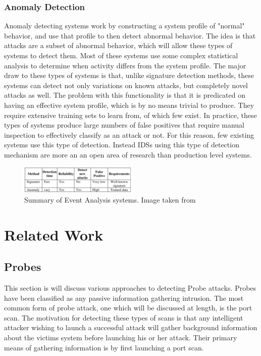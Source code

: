 \documentclass{acm_proc_article-sp}
\begin{document}
    	\subsubsection{Anomaly Detection}
    		Anomaly detecting systems work by constructing a system profile of "normal" behavior, and use that profile to then detect abnormal behavior. The idea is that attacks are a subset of abnormal behavior, which will allow these types of systems to detect them. Most of these systems use some complex statistical analysis to determine when activity differs from the system profile. The major draw to these types of systems is that, unlike signature detection methods, these systems can detect not only variations on known attacks, but completely novel attacks as well. The problem with this functionality is that it is predicated on having an effective system profile, which is by no means trivial to produce. They require extensive training sets to learn from, of which few exist. In practice, these types of systems produce large numbers of false positives that require manual inspection to effectively classify as an attack or not. For this reason, few existing systems use this type of detection. Instead IDSs using this type of detection mechanism are more an an open area of research than production level systems. 
    	\begin{figure}[h!]
			\centering
			\includegraphics[width=0.5\textwidth]{signatreVSanomaly.png}
			\caption{Summary of Event Analysis systems. Image taken from \cite{Alenezi2012}}
			\label{comparison}
	\end{figure}
\section{Related Work}
    \subsection{Probes}
	 This section is will discuss various approaches to detecting Probe attacks. Probes have been classified as any passive information gathering intrusion. The most common form of probe attack, one which will be discussed at length, is the port scan. The motivation for detecting these types of scans is that any intelligent attacker wishing to launch a successful attack will gather background information about the victims system before launching his or her attack. Their primary means of gathering information is by first launching a port scan.
	 
\end{document}

